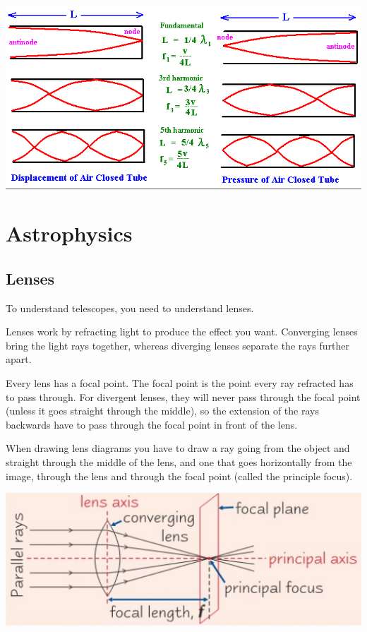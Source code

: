 \documentclass[a4paper, 12pt]{article}
\begin{document}
\begin{center}
\includegraphics[width=\textwidth]{images/harmonicInTube.png}
\end{center}

\newpage
\section{Astrophysics}

\subsection{Lenses}

To understand telescopes, you need to understand lenses.

Lenses work by refracting light to produce the effect you want. Converging lenses bring the light rays together, whereas diverging lenses separate the rays further apart.

Every lens has a focal point. The focal point is the point every ray refracted has to pass through. For divergent lenses, they will never pass through the focal point (unless it goes straight through the middle), so the extension of the rays backwards have to pass through the focal point in front of the lens.

When drawing lens diagrams you have to draw a ray going from the object and straight through the middle of the lens, and one that goes horizontally from the image, through the lens and through the focal point (called the principle focus).

\includegraphics[width=\textwidth]{images/lensDiagram.png}
\end{document}
